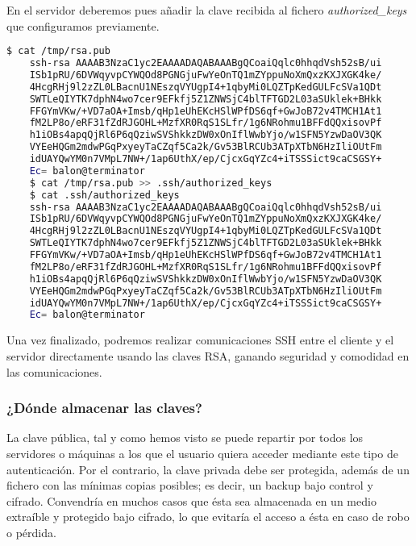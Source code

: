 \documentclass[a4paper, 11pt, titlepage]{article}
\begin{document}
        En el servidor deberemos pues añadir la clave recibida al fichero \textit{authorized\_keys}
        que configuramos previamente.
        
        \begin{lstlisting}[language=bash,basicstyle=\scriptsize]
    $ cat /tmp/rsa.pub
    ssh-rsa AAAAB3NzaC1yc2EAAAADAQABAAABgQCoaiQqlc0hhqdVsh52sB/ui
    ISb1pRU/6DVWqyvpCYWQOd8PGNGjuFwYeOnTQ1mZYppuNoXmQxzKXJXGK4ke/
    4HcgRHj9l2zZL0LBacnU1NEszqVYUgpI4+1qbyMi0LQZTpKedGULFcSVa1QDt
    SWTLeQIYTK7dphN4wo7cer9EFkfj5Z1ZNWSjC4blTFTGD2L03aSUklek+BHkk
    FFGYmVKw/+VD7aOA+Imsb/qHp1eUhEKcHSlWPfDS6qf+GwJoB72v4TMCH1At1
    fM2LP8o/eRF31fZdRJGOHL+MzfXR0RqS1SLfr/1g6NRohmu1BFFdQQxisovPf
    h1iOBs4apqQjRl6P6qQziwSVShkkzDW0xOnIflWwbYjo/w1SFN5YzwDaOV3QK
    VYEeHQGm2mdwPGqPxyeyTaCZqf5Ca2k/Gv53BlRCUb3ATpXTbN6HzIliOUtFm
    idUAYQwYM0n7VMpL7NW+/1ap6UthX/ep/CjcxGqYZc4+iTSSSict9caCSGSY+
    Ec= balon@terminator
    $ cat /tmp/rsa.pub >> .ssh/authorized_keys
    $ cat .ssh/authorized_keys
    ssh-rsa AAAAB3NzaC1yc2EAAAADAQABAAABgQCoaiQqlc0hhqdVsh52sB/ui
    ISb1pRU/6DVWqyvpCYWQOd8PGNGjuFwYeOnTQ1mZYppuNoXmQxzKXJXGK4ke/
    4HcgRHj9l2zZL0LBacnU1NEszqVYUgpI4+1qbyMi0LQZTpKedGULFcSVa1QDt
    SWTLeQIYTK7dphN4wo7cer9EFkfj5Z1ZNWSjC4blTFTGD2L03aSUklek+BHkk
    FFGYmVKw/+VD7aOA+Imsb/qHp1eUhEKcHSlWPfDS6qf+GwJoB72v4TMCH1At1
    fM2LP8o/eRF31fZdRJGOHL+MzfXR0RqS1SLfr/1g6NRohmu1BFFdQQxisovPf
    h1iOBs4apqQjRl6P6qQziwSVShkkzDW0xOnIflWwbYjo/w1SFN5YzwDaOV3QK
    VYEeHQGm2mdwPGqPxyeyTaCZqf5Ca2k/Gv53BlRCUb3ATpXTbN6HzIliOUtFm
    idUAYQwYM0n7VMpL7NW+/1ap6UthX/ep/CjcxGqYZc4+iTSSSict9caCSGSY+
    Ec= balon@terminator\end{lstlisting}
        
        Una vez finalizado, podremos realizar comunicaciones SSH entre el cliente y 
        el servidor directamente usando las claves RSA, ganando seguridad y comodidad 
        en las comunicaciones.

        \subsubsection{¿Dónde almacenar las claves?}

            La clave pública, tal y como hemos visto se puede repartir por todos los servidores o máquinas 
            a los que el usuario quiera acceder mediante este tipo de autenticación. Por el contrario, la 
            clave privada debe ser protegida, además de un fichero con las mínimas copias posibles; es decir, 
            un backup bajo control y cifrado. Convendría en muchos casos que ésta sea almacenada en un medio 
            extraíble y protegido bajo cifrado, lo que evitaría el acceso a ésta en caso de robo o pérdida.
\end{document}
